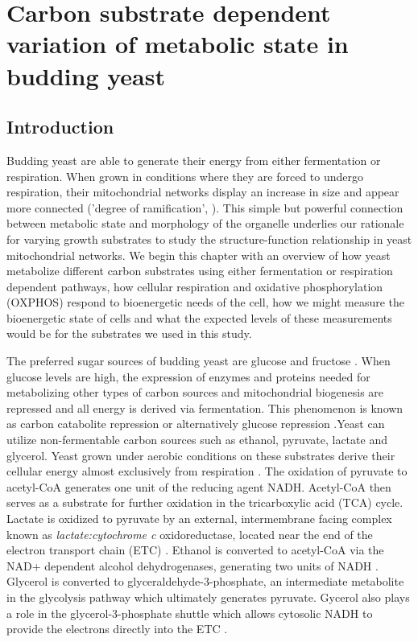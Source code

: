 \chapter[Modulating metabolic state]{ Carbon substrate dependent variation of metabolic state in budding yeast}\label{ch:three}
\clearpage
\section{Introduction}
Budding yeast are able to generate their energy from either fermentation or respiration. When grown in conditions where they are forced to undergo respiration, their mitochondrial networks display an increase in size and appear more connected ('degree of ramification', \cite{jakobs_spatial_2003}). This simple but powerful connection between metabolic state and morphology of the organelle underlies our rationale for varying growth substrates to study the structure-function relationship in yeast mitochondrial networks. We begin this chapter with an overview of how yeast metabolize different carbon substrates using either fermentation or respiration dependent pathways, how cellular respiration and oxidative phosphorylation (OXPHOS) respond to bioenergetic needs of the cell, how we might measure the bioenergetic state of cells and what the expected levels of these measurements would be for the substrates we used in this study.

The preferred sugar sources of budding yeast are glucose and fructose \cite{bergman_growth_2001}. When glucose levels are high, the expression of enzymes and proteins needed for metabolizing other types of carbon sources and mitochondrial biogenesis are repressed and all energy is derived via fermentation. This phenomenon is known as carbon catabolite repression or alternatively glucose repression \cite{gancedo_yeast_1998}.Yeast can utilize non-fermentable carbon sources such as ethanol, pyruvate, lactate and glycerol. Yeast grown under aerobic conditions on these substrates derive their cellular energy almost exclusively from respiration \cite{fendt_transcriptional_2010}. The oxidation of pyruvate to acetyl-CoA generates one unit of the reducing agent NADH. Acetyl-CoA then serves as a substrate for further oxidation in the tricarboxylic acid (TCA) cycle. Lactate is oxidized to pyruvate by an external, intermembrane facing complex known as \emph{lactate:cytochrome c} oxidoreductase, located near the end of the electron transport chain (ETC) \cite{pajot_utilization_1974}. Ethanol is converted to acetyl-CoA via the NAD+ dependent alcohol dehydrogenases, generating two units of NADH \cite{luttik_saccharomyces_1998,wills_regulation_1990}. Glycerol is converted to glyceraldehyde-3-phosphate, an intermediate metabolite in the glycolysis pathway which ultimately generates pyruvate. Gycerol also plays a role in the glycerol-3-phosphate shuttle which allows cytosolic NADH to provide the electrons directly into the ETC \cite{larsson_importance_1998}.


